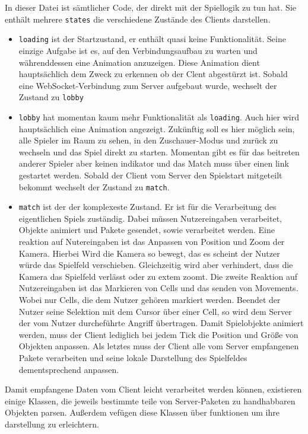 In dieser Datei ist sämtlicher Code, der direkt mit der Spiellogik zu tun hat. Sie enthält mehrere \verb+states+ die verschiedene Zustände des Clients darstellen.
\begin{itemize}
	\item \verb+loading+ ist der Startzustand, er enthält quasi keine Funktionalität. Seine einzige Aufgabe ist es, auf den Verbindungsaufbau zu warten und währenddessen eine Animation anzuzeigen. Diese Animation dient hauptsächlich dem Zweck zu erkennen ob der Clent abgestürzt ist. Sobald eine WebSocket-Verbindung zum Server aufgebaut wurde, wechselt der Zustand zu \verb+lobby+
	\item \verb+lobby+ hat momentan kaum mehr Funktionalität als \verb+loading+. Auch hier wird hauptsächlich eine Animation angezeigt. Zukünftig soll es hier möglich sein, alle Spieler im Raum zu sehen, in den Zuschauer-Modus und zurück zu wechseln und das Spiel direkt zu starten. Momentan gibt es für das beitreten anderer Spieler aber keinen indikator und das Match muss über einen link gestartet werden. Sobald der Client vom Server den Spielstart mitgeteilt bekommt wechselt der Zustand zu \verb+match+.
	\item \verb+match+ ist der der komplexeste Zustand. Er ist für die Verarbeitung des eigentlichen Spiels zuständig. Dabei müssen Nutzereingaben verarbeitet, Objekte animiert und Pakete gesendet, sowie verarbeitet werden.
Eine reaktion auf Nutereingaben ist das Anpassen von Position und Zoom der Kamera. Hierbei Wird die Kamera so bewegt, das es scheint der Nutzer würde das Spielfeld verschieben. Gleichzeitig wird aber verhindert, dass die Kamera das Spielfeld verlässt oder zu extem zoomt.
	Die zweite Reaktion auf Nutzereingaben ist das Markieren von Cells und das senden von Movements. Wobei nur Cells, die dem Nutzer gehören markiert werden. Beendet der Nutzer seine Selektion mit dem Cursor über einer Cell, so wird dem Server der vom Nutzer durcheführte Angriff übertragen.
	Damit Spielobjekte animiert werden, muss der Client lediglich bei jedem Tick die Position und Größe von Objekten anpassen.
	Als letztes muss der Client alle vom Server empfangenen Pakete verarbeiten und seine lokale Darstellung des Spielfeldes dementsprechend anpassen.
\end{itemize}

Damit empfangene Daten vom Client leicht verarbeitet werden können, existieren einige Klassen, die jeweils bestimmte teile von Server-Paketen zu handhabbaren Objekten parsen. Außerdem vefügen diese Klassen über funktionen um ihre darstellung zu erleichtern.


